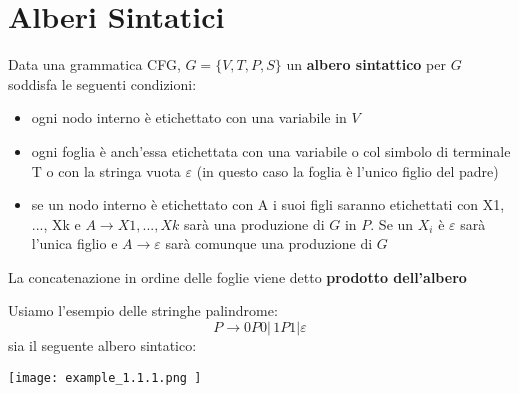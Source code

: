 \section{Alberi Sintatici}
\begin{definition}
	Data una grammatica CFG, $G=\{V,T,P,S\}$ un \textbf{albero sintattico} per $G$ soddisfa le seguenti condizioni:
	\begin{itemize}
		\item ogni nodo interno è etichettato con una variabile in $V$
		\item ogni foglia è anch'essa etichettata con una variabile o col simbolo di terminale T o con la stringa vuota $\varepsilon$ (in questo caso la foglia è l'unico figlio del padre)
		\item se un nodo interno è etichettato con A i suoi figli saranno etichettati con X1, ..., Xk e $A\to  X1, ..., Xk$ sarà una produzione di $G$ in $P$. Se un $X_i$ è $\varepsilon$ sarà l'unica figlio e $A\to \varepsilon$ sarà comunque una produzione di $G$
	\end{itemize}
	La concatenazione in ordine delle foglie viene detto \textbf{prodotto dell'albero}
\end{definition}
\newpage
\begin{example}
	Usiamo l'esempio delle stringhe palindrome:
	$$P\to 0P0|\,1P1|\varepsilon$$
	sia il seguente albero sintatico:
	\begin{center}
\texttt{[image: example\_1.1.1.png
]}
	\end{center}
\end{example}
